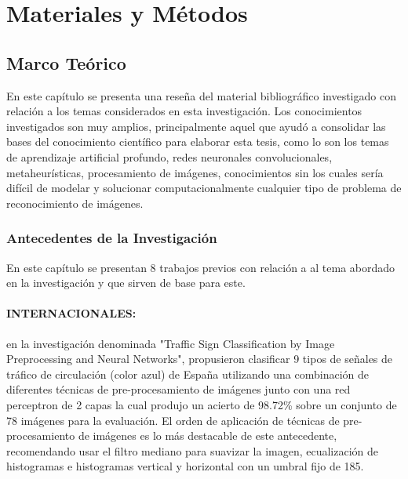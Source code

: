 \chapter{Materiales y Métodos}
\setcounter{page}{11}
\renewcommand{\baselinestretch}{1.2} %

\section{Marco Teórico} 

En este capítulo se presenta una reseña del material bibliográfico investigado con relación a los temas considerados en esta investigación. Los conocimientos investigados son muy amplios, principalmente aquel que ayudó a consolidar las bases del conocimiento científico para elaborar esta tesis, como lo son los temas de aprendizaje artificial profundo, redes neuronales convolucionales, metaheurísticas, procesamiento de imágenes, conocimientos sin los cuales sería difícil de modelar y solucionar computacionalmente cualquier tipo de problema de reconocimiento de imágenes.

\subsection{Antecedentes de la Investigación}

	En este capítulo se presentan 8 trabajos previos con relación a al tema abordado en la investigación y que sirven de base para este.
	\vskip 0.4cm

	\subsubsection
	{INTERNACIONALES:}
		\citep{VicenBueno2007} en la investigación denominada "Traffic Sign Classification by Image Preprocessing and Neural Networks", propusieron clasificar 9 tipos de señales de tráfico de circulación (color azul) de España utilizando una combinación de diferentes técnicas de pre-procesamiento de imágenes junto con una red perceptron de 2 capas la cual produjo un acierto de 98.72\% sobre un conjunto de 78 imágenes para la evaluación. El orden de aplicación de técnicas de pre-procesamiento de imágenes es lo más destacable de este antecedente, recomendando usar el filtro mediano para suavizar la imagen, ecualización de histogramas e histogramas vertical y horizontal con un umbral fijo de 185.
		\vskip 0.4cm

